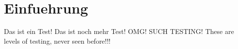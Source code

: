 \section{Einfuehrung}

Das ist ein Test! Das ist noch mehr Test! OMG! SUCH TESTING! These are levels of testing, never seen before!!!

\newpage
